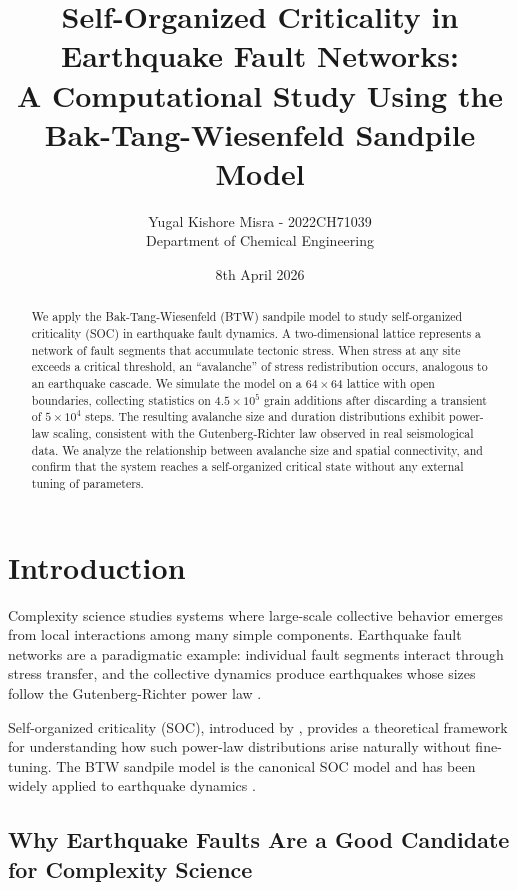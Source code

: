 \documentclass[12pt,a4paper]{article}
\title{Self-Organized Criticality in Earthquake Fault Networks:\\
A Computational Study Using the Bak-Tang-Wiesenfeld Sandpile Model}
\author{Yugal Kishore Misra - 2022CH71039\\
Department of Chemical Engineering\\
}
\date{8th April 2026}
\begin{document}
\maketitle

\begin{abstract}
We apply the Bak-Tang-Wiesenfeld (BTW) sandpile model to study
self-organized criticality (SOC) in earthquake fault dynamics.
A two-dimensional lattice represents a network of fault segments
that accumulate tectonic stress. When stress at any site exceeds
a critical threshold, an ``avalanche'' of stress redistribution
occurs, analogous to an earthquake cascade. We simulate the model
on a $64 \times 64$ lattice with open boundaries, collecting
statistics on $4.5 \times 10^5$ grain additions after discarding
a transient of $5 \times 10^4$ steps. The resulting avalanche size
and duration distributions exhibit power-law scaling, consistent
with the Gutenberg-Richter law observed in real seismological data.
We analyze the relationship between avalanche size and spatial
connectivity, and confirm that the system reaches a self-organized
critical state without any external tuning of parameters.
\end{abstract}

\section{Introduction}

Complexity science studies systems where large-scale collective behavior
emerges from local interactions among many simple components. Earthquake
fault networks are a paradigmatic example: individual fault segments
interact through stress transfer, and the collective dynamics produce
earthquakes whose sizes follow the Gutenberg-Richter power law
\citep{gutenberg1944}.

Self-organized criticality (SOC), introduced by \citet{bak1987}, provides
a theoretical framework for understanding how such power-law distributions
arise naturally without fine-tuning. The BTW sandpile model is the canonical
SOC model and has been widely applied to earthquake dynamics
\citep{olami1992, bak2002}.

\subsection{Why Earthquake Faults Are a Good Candidate for Complexity Science}
\end{document}
